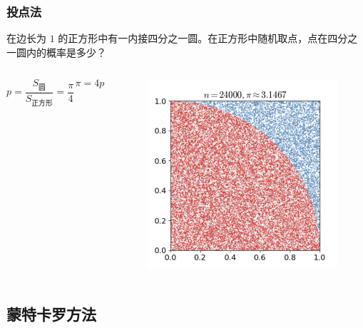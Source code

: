 \documentclass{beamer}
\begin{document}
\begin{frame}
    \frametitle{投点法}

    \begin{problem}
        在边长为 $1$ 的正方形中有一内接四分之一圆。在正方形中随机取点，点在四分之一圆内的概率是多少？   
    \end{problem}

    \begin{columns}

        $$p = \frac{S_{\text{圆}}}{S_{\text{正方形}}} = \frac{\pi}{4}$$
    
        $$\pi = 4p$$


        \begin{figure}
            \centering
            \includegraphics[scale=0.12]{res/pi_calc.png}
        \end{figure}
    \end{columns}

\end{frame}

\subsection{蒙特卡罗方法}
\end{document}
